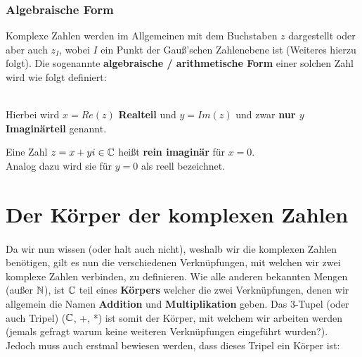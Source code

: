 \documentclass[../MAIN/main.tex]{subfiles}
\begin{document}
	\subsubsection{Algebraische Form}

	\begin{Definition}
		Komplexe Zahlen werden im Allgemeinen mit dem Buchstaben $z$ dargestellt oder aber auch $z_I$, wobei $I$ ein Punkt der Gauß'schen Zahlenebene ist (Weiteres hierzu folgt). Die sogenannte \textbf{algebraische / arithmetische Form} einer solchen Zahl wird wie folgt definiert:
		\\
		\\
		Hierbei wird $x = Re(z)$ \textbf{Realteil} und $y = Im(z)$ und zwar \textbf{nur $y$ Imaginärteil} genannt.
	\end{Definition}

	\begin{Bemerkung}
		Eine Zahl $z = x + yi \in \mathbb{C}$ heißt \textbf{rein imaginär} für $x = 0$.
		\\
		Analog dazu wird sie für $y = 0$ als reell bezeichnet.
	\end{Bemerkung}


\section{Der Körper der komplexen Zahlen}

	\paragraph{} Da wir nun wissen (oder halt auch nicht), weshalb wir die komplexen Zahlen benötigen, gilt es nun die verschiedenen Verknüpfungen, mit welchen wir zwei komplexe Zahlen verbinden, zu definieren. Wie alle anderen bekannten Mengen (außer $\mathbb{N}$), ist $\mathbb{C}$ teil eines \textbf{Körpers} welcher die zwei Verknüpfungen, denen wir allgemein die Namen \textbf{Addition} und \textbf{Multiplikation} geben. Das 3-Tupel (oder auch Tripel) ($\mathbb{C}$, +, *) ist somit der Körper, mit welchem wir arbeiten werden (jemals gefragt warum keine weiteren Verknüpfungen eingeführt wurden?). Jedoch muss auch erstmal bewiesen werden, dass dieses Tripel ein Körper ist:
\end{document}
